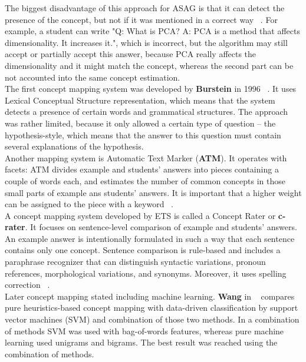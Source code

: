 \documentclass[11pt]{report}
\numberwithin{equation}{section} %
\begin{document}
The biggest disadvantage of this approach for ASAG is that it can detect the presence of the concept, but not if it was mentioned in a correct way ~\cite{Dzikovska}. For example, a student can write "Q: What is PCA? A: PCA is a method that affects dimensionality. It increases it.", which is incorrect, but the algorithm may still accept or partially accept this answer, because PCA really affects the dimensionality and it might match the concept, whereas the second part can be not accounted into the same concept estimation.\\

The first concept mapping system was developed by \textbf{Burstein} in 1996 ~\cite{Burrows}. It uses  Lexical Conceptual Structure representation, which means that the system detects a presence of certain words and grammatical structures. The approach was rather limited, because it only allowed a certain type of question -- the  hypothesis-style, which means that the answer to this question must contain several explanations of the hypothesis.\\

Another mapping system is Automatic Text Marker (\textbf{ATM}). It operates with facets: ATM divides example and students' answers into pieces containing a couple of words each, and estimates the number of common concepts in those small parts of example ans students' answers. It is important that a higher weight can be assigned to the piece with a keyword ~\cite{Burrows}.\\

A concept mapping system developed by ETS is called a Concept Rater or \textbf{c-rater}. It focuses on sentence-level comparison of example and students' answers. An example answer is intentionally formulated in such a way that each sentence contains only one concept. Sentence comparison is rule-based and includes a paraphrase recognizer that can distinguish syntactic variations, pronoun references, morphological variations, and synonyms. Moreover, it uses spelling correction ~\cite{c-rater}. \\

Later concept mapping stated including machine learning. \textbf{Wang} in ~\cite{Wang} compares pure heuristics-based concept mapping with  data-driven classification by support vector machines (SVM) and combination of those two methods. In a combination of methods SVM was used with bag-of-words features, whereas pure machine learning used unigrams and bigrams. The best result was reached using the combination of methods.\\
\end{document}
